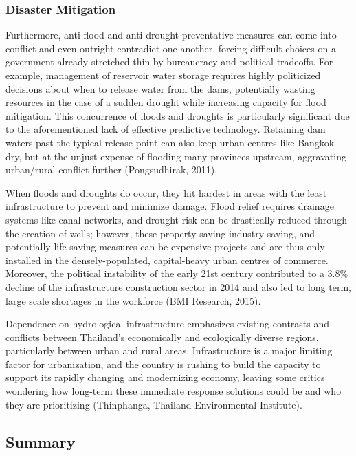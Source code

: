 \subsubsection{Disaster Mitigation}

Furthermore, anti-flood and anti-drought preventative measures can come into conflict and even outright contradict one another, forcing difficult choices on a government already stretched thin by bureaucracy and political tradeoffs. For example, management of reservoir water storage requires highly politicized decisions about when to release water from the dams, potentially wasting resources in the case of a sudden drought while increasing capacity for flood mitigation. This concurrence of floods and droughts is particularly significant due to the aforementioned lack of effective predictive technology. Retaining dam waters past the typical release point can also keep urban centres like Bangkok dry, but at the unjust expense of flooding many provinces upstream, aggravating urban/rural conflict further (Pongsudhirak, 2011). 

When floods and droughts do occur, they hit hardest in areas with the least infrastructure to prevent and minimize damage. Flood relief requires drainage systems like canal networks, and drought risk can be drastically reduced through the creation of wells; however, these property-saving industry-saving, and potentially life-saving measures can be expensive projects and are thus only installed in the densely-populated, capital-heavy urban centres of commerce. Moreover, the political instability of the early 21st century contributed to a 3.8\% decline of the infrastructure construction sector in 2014 and also led to long term, large scale shortages in the workforce (BMI Research, 2015).

Dependence on hydrological infrastructure emphasizes existing contrasts and conflicts between Thailand’s economically and ecologically diverse regions, particularly between urban and rural areas. Infrastructure is a major limiting factor for urbanization, and the country is rushing to build the capacity to support its rapidly changing and modernizing economy, leaving some critics wondering how long-term these immediate response solutions could be and who they are prioritizing (Thinphanga, Thailand Environmental Institute). 

\subsection{Summary}

